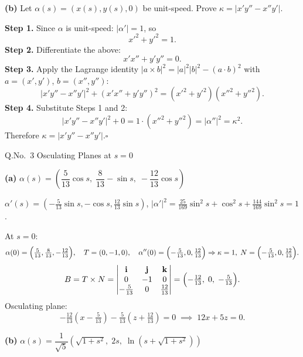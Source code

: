 \documentclass[12pt]{article}
\begin{document}
\vspace{10pt}
\textbf{(b)} Let $\alpha(s)=(x(s),y(s),0)$ be unit-speed. Prove $\kappa=|x'y''-x''y'|$.

\begin{ansbox}
\textbf{Step 1.} Since $\alpha$ is unit-speed: $|\alpha'|=1$, so
\[
  x'^2+y'^2=1.
\]
\textbf{Step 2.} Differentiate the above:
\[
  x'x''+y'y''=0.
\]
\textbf{Step 3.} Apply the Lagrange identity $|a\times b|^2=|a|^2|b|^2-(a\cdot b)^2$ with $a=(x',y')$, $b=(x'',y'')$:
\[
  |x'y''-x''y'|^2+(x'x''+y'y'')^2=(x'^2+y'^2)(x''^2+y''^2).
\]
\textbf{Step 4.} Substitute Steps 1 and 2:
\[
  |x'y''-x''y'|^2 + 0 = 1\cdot(x''^2+y''^2)=|\alpha''|^2=\kappa^2.
\]
Therefore $\kappa=|x'y''-x''y'|$.\hfill$\square$
\end{ansbox}

\vspace{14pt}

\begin{qbox}{Q.No.\ 3}
Osculating Planes at $s=0$\quad [Equation: $(\mathbf{r}-\alpha(0))\cdot B(0)=0$]
\end{qbox}

\vspace{6pt}
\textbf{(a)} $\alpha(s)=\left(\dfrac{5}{13}\cos s,\;\dfrac{8}{13}-\sin s,\;-\dfrac{12}{13}\cos s\right)$

\begin{ansbox}
$\alpha'(s)=(-\tfrac{5}{13}\sin s,-\cos s,\tfrac{12}{13}\sin s)$, \quad $|\alpha'|^2=\tfrac{25}{169}\sin^2s+\cos^2s+\tfrac{144}{169}\sin^2s=1$.\;\checkmark

At $s=0$:
\[
  \alpha(0)=\Bigl(\tfrac{5}{13},\tfrac{8}{13},-\tfrac{12}{13}\Bigr),\quad T=(0,-1,0),\quad
  \alpha''(0)=\Bigl(-\tfrac{5}{13},0,\tfrac{12}{13}\Bigr)\Rightarrow\kappa=1,\;N=\Bigl(-\tfrac{5}{13},0,\tfrac{12}{13}\Bigr).
\]
\[
  B=T\times N=\begin{vmatrix}\mathbf{i}&\mathbf{j}&\mathbf{k}\\0&-1&0\\-\frac{5}{13}&0&\frac{12}{13}\end{vmatrix}
  =\Bigl(-\tfrac{12}{13},\;0,\;-\tfrac{5}{13}\Bigr).
\]
Osculating plane:
\[
  -\tfrac{12}{13}(x-\tfrac{5}{13})-\tfrac{5}{13}(z+\tfrac{12}{13})=0\;\implies\;\boxed{12x+5z=0}.
\]
\end{ansbox}

\vspace{10pt}
\textbf{(b)} $\alpha(s)=\dfrac{1}{\sqrt{5}}\!\left(\sqrt{1+s^2},\;2s,\;\ln(s+\sqrt{1+s^2})\right)$
\end{document}
